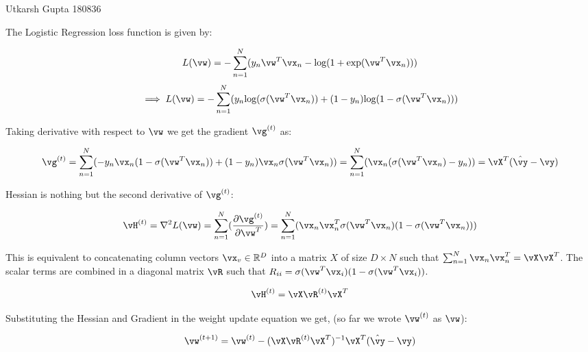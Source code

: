 \documentclass[a4paper,11pt]{article}
\begin{document}
\graphicspath{ {./P6/Plots/} }

{Utkarsh Gupta}   %
{180836}	%

\begin{mlsolution}

The Logistic Regression loss function is given by:

\begin{equation*}
    L(\vw) = -\sum_{n=1}^{N}(y_n\vw^T\vx_n - \text{log}(1+\text{exp}(\vw^T\vx_n)))
\end{equation*}
\begin{equation*}
    \implies L(\vw) = -\sum_{n=1}^{N}(y_n\text{log}(\sigma(\vw^T\vx_n)) + (1-y_n)\text{log}(1-\sigma(\vw^T\vx_n)))
\end{equation*}

Taking derivative with respect to $\vw$ we get the gradient $\vg^{(t)}$ as:

\begin{equation*}
    \vg^{(t)} = \sum_{n=1}^{N}(-y_n\vx_n(1-\sigma(\vw^T\vx_n))+(1-y_n)\vx_n\sigma(\vw^T\vx_n))=\sum_{n=1}^{N}(\vx_n(\sigma(\vw^T\vx_n)-y_n)) = \vX^T(\hat{\vy}-\vy)
\end{equation*}

Hessian is nothing but the second derivative of $\vg^{(t)}$:

\begin{equation*}
    \vH^{(t)}=\vec{\nabla}^2L(\vw)=\sum\limits_{n=1}^{N}(\frac{\partial \vg^{(t)}}{\partial \vw^T})=\sum\limits_{n=1}^{N}(\vx_n\vx_n^T\sigma(\vw^T\vx_n)(1-\sigma(\vw^T\vx_n)))
\end{equation*}

This is equivalent to concatenating column vectors $\vx_v\in\mathbb{R}^D$ into a matrix $X$ of size $D\times N$ such that $\sum_{n=1}^N \vx_n\vx_n^T=\vX\vX^T$. The scalar terms are combined in a diagonal matrix $\vR$ such that $R_{ii}=\sigma(\vw^T\vx_i)(1-\sigma(\vw^T\vx_i))$.

\begin{equation*}
    \vH^{(t)} = \vX\vR^{(t)}\vX^T
\end{equation*}

Substituting the Hessian and Gradient in the weight update equation we get, (so far we wrote $\vw^{(t)}$ as $\vw$):

\begin{equation*}
    \vw^{(t+1)} = \vw^{(t)} - (\vX\vR^{(t)}\vX^T)^{-1}\vX^T(\hat{\vy}-\vy)
\end{equation*}


\end{mlsolution}
\end{document}
